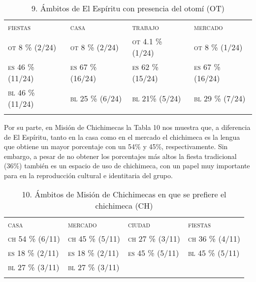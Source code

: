 \documentclass[output=paper]{../langscibook}
\begin{document}
\begin{table}
\caption{\label{tab:guerrero}9. Ámbitos de El Espíritu con presencia del otomí (OT)}


\begin{tabularx}{\textwidth}{XXXX}
\lsptoprule
\textsc{fiestas} & {\textsc{casa}} & {\textsc{trabajo}} & {\textsc{mercado}}\\
{\textsc{ot} \textsc{8} \textsc{\%} \textsc{(2/24)}} & {\textsc{ot} \textsc{8} \textsc{\%} \textsc{(2/24)}} & {\textsc{ot} \textsc{4.1} \textsc{\%} \textsc{(1/24)}} & {\textsc{ot} \textsc{8} \textsc{\%} \textsc{(1/24)}}\\
{\textsc{es} \textsc{46} \textsc{\%}  \textsc{(11/24)}} & {\textsc{es} \textsc{67} \textsc{\%} \textsc{(16/24)}} & {\textsc{es} \textsc{62} \textsc{\%} \textsc{(15/24)}} & {\textsc{es} \textsc{67} \textsc{\%} \textsc{(16/24)}}\\
{\textsc{bl} \textsc{46} \textsc{\%} \textsc{(11/24)}} & {\textsc{bl} \textsc{25} \textsc{\%} \textsc{(6/24)}} & {\textsc{bl} \textsc{21\%} \textsc{(5/24)}} & {\textsc{bl} \textsc{29} \textsc{\%} \textsc{(7/24)}}\\
\lspbottomrule
\end{tabularx}
\end{table}
Por su parte, en Misión de Chichimecas la Tabla 10 nos muestra que, a diferencia de El Espíritu, tanto en la casa como en el mercado el chichimeca es la lengua que obtiene un mayor porcentaje con un 54\% y 45\%, respectivamente. Sin embargo, a pesar de no obtener los porcentajes más altos la fiesta tradicional (36\%) también es un espacio de uso de chichimeca, con un papel muy importante para en la reproducción cultural e identitaria del grupo.

\begin{table}
\caption{\label{tab:guerrero}10. Ámbitos de Misión de Chichimecas en que se prefiere el chichimeca (CH)}
\begin{tabularx}{\textwidth}{XXXX}
\lsptoprule
{\textsc{casa}} & {\textsc{mercado}} & {\textsc{ciudad}} & {\textsc{fiestas}}\\
{\textsc{ch} \textsc{54} \textsc{\%} \textsc{(6/11)}} & {\textsc{ch} \textsc{45} \textsc{\%} \textsc{(5/11)}} & {\textsc{ch} \textsc{27} \textsc{\%} \textsc{(3/11)}} & {\textsc{ch} \textsc{36} \textsc{\%} \textsc{(4/11)}}\\
{\textsc{es} \textsc{18} \textsc{\%} \textsc{(2/11)}} & {\textsc{es} \textsc{18} \textsc{\%} \textsc{(2/11)}} & {\textsc{es} \textsc{45} \textsc{\%} \textsc{(5/11)}} & {\textsc{bl} \textsc{45} \textsc{\%} \textsc{(5/11)}}\\
{\textsc{bl} \textsc{27} \textsc{\%} \textsc{(3/11)}} & {\textsc{bl} \textsc{27} \textsc{\%} \textsc{(3/11)}} &  & \\
\lspbottomrule
\end{tabularx}
\end{table}
\end{document}
